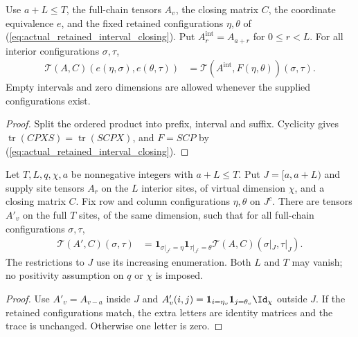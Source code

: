 \begin{lemma}
    \label{thm:actual_retained_interval_trace}
    \leanok
    Use $a+L\le T$, the full-chain tensors $A_v$, the closing matrix $C$,
    the coordinate equivalence $e$, and the fixed retained configurations
    $\eta,\theta$ of (\ref{eq:actual_retained_interval_closing}).
    Put $A^{\mathrm{int}}_r=A_{a+r}$ for $0\le r<L$.
    For all interior configurations $\sigma,\tau$,
    \begin{align}
        \mathcal T(A,C)(e(\eta,\sigma),e(\theta,\tau))
         & =\mathcal T(A^{\mathrm{int}},F(\eta,\theta))(\sigma,\tau).
        \label{eq:actual_retained_interval_trace}
    \end{align}
    Empty intervals and zero dimensions are allowed whenever the supplied
    configurations exist.
\end{lemma}
\begin{proof}\leanok
    Split the ordered product into prefix, interval and suffix.
    Cyclicity gives $\operatorname{tr}(CPXS)=\operatorname{tr}(SCPX)$,
    and $F=SCP$ by (\ref{eq:actual_retained_interval_closing}).
\end{proof}

\begin{lemma}
    \label{thm:retained_single_trace_insert}
    \leanok
    Let $T,L,q,\chi,a$ be nonnegative integers with $a+L\le T$.
    Put $J=[a,a+L)$ and supply site tensors $A_r$ on the $L$ interior sites,
    of virtual dimension $\chi$, and a closing matrix $C$.
    Fix row and column configurations $\eta,\theta$ on $J^c$.
    There are tensors $A'_v$ on the full $T$ sites, of the same dimension,
    such that for all full-chain configurations $\sigma,\tau$,
    \begin{align}
        \mathcal T(A',C)(\sigma,\tau)
         & =\mathbf1_{\sigma|_{J^c}=\eta}\mathbf1_{\tau|_{J^c}=\theta}
        \mathcal T(A,C)(\sigma|_J,\tau|_J).
        \label{eq:retained_single_trace_insert}
    \end{align}
    The restrictions to $J$ use its increasing enumeration. Both $L$ and
    $T$ may vanish; no positivity assumption on $q$ or $\chi$ is imposed.
\end{lemma}
\begin{proof}\leanok
    Use $A'_v=A_{v-a}$ inside $J$ and
    $A'_v(i,j)=\mathbf1_{i=\eta_v}\mathbf1_{j=\theta_v}\Id_\chi$ outside $J$.
    If the retained configurations match, the extra letters are identity
    matrices and the trace is unchanged. Otherwise one letter is zero.
\end{proof}

